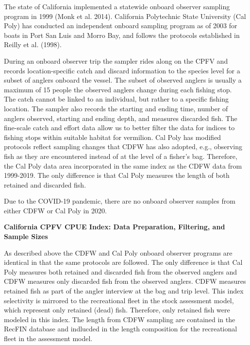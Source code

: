 \documentclass[11pt,
  english,
  a4paper,
]{article}
\begin{document}
\leavevmode\tagmcend\tagstructend

The state of California implemented a statewide onboard observer sampling program in 1999 {(Monk et al. 2014)\leavevmode\tagmcend\tagstructend}. California Polytechnic State University (Cal Poly) has conducted an independent onboard sampling program as of 2003 for boats in Port San Luis and Morro Bay, and follows the protocols established in Reilly et al. {(1998)\leavevmode\tagmcend\tagstructend}.

During an onboard observer trip the sampler rides along on the CPFV and records location-specific catch and discard information to the species level for a subset of anglers onboard the vessel. The subset of observed anglers is usually a maximum of 15 people the observed anglers change during each fishing stop.\\
The catch cannot be linked to an individual, but rather to a specific fishing location. The sampler also records the starting and ending time, number of anglers observed, starting and ending depth, and measures discarded fish. The fine-scale catch and effort data allow us to better filter the data for indices to fishing stops within suitable habitat for vermilion. Cal Poly has modified protocols reflect sampling changes that CDFW has also adopted, e.g., observing fish as they are encountered instead of at the level of a fisher's bag. Therefore, the Cal Poly data area incorporated in the same index as the CDFW data from 1999-2019. The only difference is that Cal Poly measures the length of both retained and discarded fish.

Due to the COVID-19 pandemic, there are no onboard observer samples from either CDFW or Cal Poly in 2020.

\textbf{California CPFV CPUE Index: Data Preparation, Filtering, and Sample Sizes}

As described above the CDFW and Cal Poly onboard observer programs are identical in that the same protocols are followed. The only difference is that Cal Poly measures both retained and discarded fish from the observed anglers and CDFW measures only discarded fish from the observed anglers. CDFW measures retained fish as part of the angler interview at the bag and trip level. This index selectivity is mirrored to the recreational fleet in the stock assessment model, which represent only retained (dead) fish. Therefore, only retained fish were modeled in this index. The length from CDFW sampling are contained in the RecFIN database and indlucded in the length composition for the recreational fleet in the assessment model.
\end{document}
